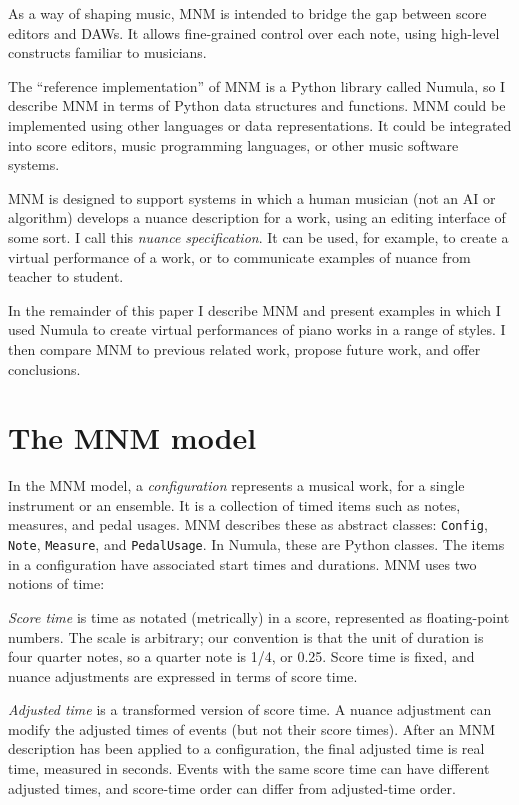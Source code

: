 \documentclass[letterpaper, 12pt]{article}
\begin{document}
As a way of shaping music,
MNM is intended to bridge the gap between score editors and DAWs.
It allows fine-grained control over each note,
using high-level constructs familiar to musicians.

The ``reference implementation'' of MNM is a Python library called Numula,
so I describe MNM in terms of Python data structures and functions.
MNM could be implemented using other languages or data representations.
It could be integrated into score editors, music programming languages,
or other music software systems.

MNM is designed to support systems in which a human musician
(not an AI or algorithm) develops a nuance description for a work,
using an editing interface of some sort.
I call this \textit{nuance specification}.
It can be used, for example, to create a virtual performance of a work,
or to communicate examples of nuance from teacher to student.

In the remainder of this paper I describe MNM and present examples in which
I used Numula to create virtual performances of piano works in a range of styles.
I then compare MNM to previous related work,
propose future work, and offer conclusions.

\section{The MNM model}

In the MNM model, a \textit{configuration}
represents a musical work, for a single instrument or an ensemble.
It is a collection of timed items such as notes, measures, and pedal usages.
MNM describes these as abstract classes:
\texttt{Config}, \texttt{Note}, \texttt{Measure}, and \texttt{PedalUsage}.
In Numula, these are Python classes.
The items in a configuration have associated start times and durations.
MNM uses two notions of time:

\textit{Score time} is time as notated (metrically) in a score,
represented as floating-point numbers.
The scale is arbitrary;
our convention is that the unit of duration is four quarter notes,
so a quarter note is 1/4, or 0.25.
Score time is fixed,
and nuance adjustments are expressed in terms of score time.

\textit{Adjusted time} is a transformed version of score time.
A nuance adjustment can modify the
adjusted times of events (but not their score times).
After an MNM description has been applied to a configuration,
the final adjusted time is real time, measured in seconds.
Events with the same score time can have different adjusted times,
and score-time order can differ from adjusted-time order.
\end{document}
